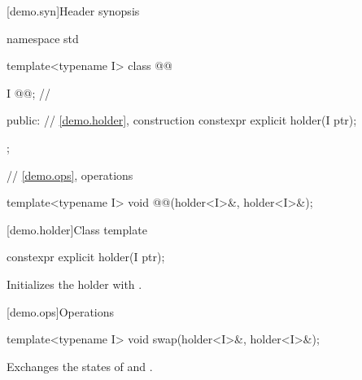 [demo.syn]{Header synopsis}

\begin{codeblock}
namespace std {
  template<typename I>
  class @@ {
    I @@; // \expos

  public:
    // \ref{demo.holder}, construction
    constexpr explicit holder(I ptr);
  };

  // \ref{demo.ops}, operations

  template<typename I> void @@(holder<I>&, holder<I>&);
}
\end{codeblock}

[demo.holder]{Class template }

%
\begin{itemdecl}
constexpr explicit holder(I ptr);
\end{itemdecl}

\begin{itemdescr}
\pnum
\effects
Initializes the holder with .
\end{itemdescr}

[demo.ops]{Operations}

%
\begin{itemdecl}
template<typename I>
  void swap(holder<I>&, holder<I>&);
\end{itemdecl}

\begin{itemdescr}
\pnum
\effects
Exchanges the states of  and .
\end{itemdescr}
